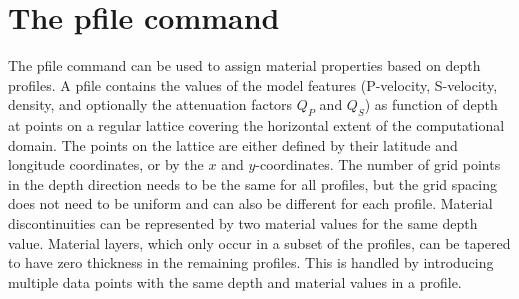 \documentclass[11pt]{report}
\begin{document}
\section{The pfile command}\label{sec:pfile}
The pfile command can be used to assign material properties based on depth profiles. A pfile
contains the values of the model features (P-velocity, S-velocity, density, and optionally the
attenuation factors $Q_P$ and $Q_S$) as function of depth at points on a regular lattice covering
the horizontal extent of the computational domain. The points on the lattice are either defined by
their latitude and longitude coordinates, or by the $x$ and $y$-coordinates. The number of grid
points in the depth direction needs to be the same for all profiles, but the grid spacing does not
need to be uniform and can also be different for each profile. Material discontinuities can be
represented by two material values for the same depth value. Material layers, which only occur in a
subset of the profiles, can be tapered to have zero thickness in the remaining profiles. This is
handled by introducing multiple data points with the same depth and material values in a profile.
\end{document}
